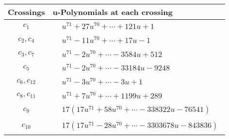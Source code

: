 \documentclass[1p]{elsarticle_modified}
\theoremstyle{definition}
\begin{document}
\begin{tabular}{m{50pt}|m{274pt}}
Crossings & \hspace{64pt}u-Polynomials at each crossing \\
\hline $$\begin{aligned}c_{1}\end{aligned}$$&$\begin{aligned}
&u^{71}+27 u^{70}+\cdots+121 u+1
\end{aligned}$\\
\hline $$\begin{aligned}c_{2},c_{4}\end{aligned}$$&$\begin{aligned}
&u^{71}-11 u^{70}+\cdots+17 u-1
\end{aligned}$\\
\hline $$\begin{aligned}c_{3},c_{7}\end{aligned}$$&$\begin{aligned}
&u^{71}-2 u^{70}+\cdots-3584 u+512
\end{aligned}$\\
\hline $$\begin{aligned}c_{5}\end{aligned}$$&$\begin{aligned}
&u^{71}-2 u^{70}+\cdots-33184 u-9248
\end{aligned}$\\
\hline $$\begin{aligned}c_{6},c_{12}\end{aligned}$$&$\begin{aligned}
&u^{71}-3 u^{70}+\cdots-3 u+1
\end{aligned}$\\
\hline $$\begin{aligned}c_{8},c_{11}\end{aligned}$$&$\begin{aligned}
&u^{71}+7 u^{70}+\cdots+1199 u+289
\end{aligned}$\\
\hline $$\begin{aligned}c_{9}\end{aligned}$$&$\begin{aligned}
&17(17 u^{71}+58 u^{70}+\cdots-338322 u-76541)
\end{aligned}$\\
\hline $$\begin{aligned}c_{10}\end{aligned}$$&$\begin{aligned}
&17(17 u^{71}-28 u^{70}+\cdots-3303678 u-843836)
\end{aligned}$\\
\hline
\end{tabular}\\~\\
\end{document}
